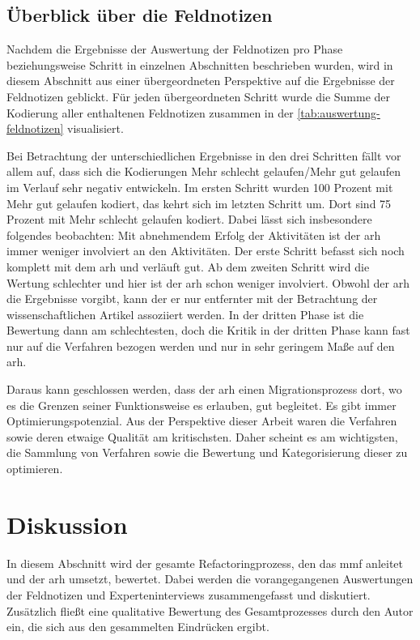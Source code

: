 \subsection{Überblick über die Feldnotizen}

Nachdem die Ergebnisse der Auswertung der Feldnotizen pro Phase beziehungsweise Schritt in einzelnen Abschnitten beschrieben wurden, wird in diesem Abschnitt aus einer übergeordneten Perspektive auf die Ergebnisse der Feldnotizen geblickt.
Für jeden übergeordneten Schritt wurde die Summe der Kodierung aller enthaltenen Feldnotizen zusammen in der \cref{tab:auswertung-feldnotizen} visualisiert.


Bei Betrachtung der unterschiedlichen Ergebnisse in den drei Schritten fällt vor allem auf, dass sich die Kodierungen \glqq Mehr schlecht gelaufen\grqq{}/\glqq Mehr gut gelaufen\grqq{} im Verlauf sehr negativ entwickeln.
Im ersten Schritt wurden 100 Prozent mit \glqq Mehr gut gelaufen\grqq{} kodiert, das kehrt sich im letzten Schritt um.
Dort sind 75 Prozent mit \glqq Mehr schlecht gelaufen\grqq{} kodiert.
Dabei lässt sich insbesondere folgendes beobachten: Mit abnehmendem Erfolg der Aktivitäten ist der \gls{arh} immer weniger involviert an den Aktivitäten.
Der erste Schritt befasst sich noch komplett mit dem \gls{arh} und verläuft gut.
Ab dem zweiten Schritt wird die Wertung schlechter und hier ist der \gls{arh} schon weniger involviert.
Obwohl der \gls{arh} die Ergebnisse vorgibt, kann der er nur entfernter mit der Betrachtung der wissenschaftlichen Artikel assoziiert werden.
In der dritten Phase ist die Bewertung dann am schlechtesten, doch die Kritik in der dritten Phase kann fast nur auf die Verfahren bezogen werden und nur in sehr geringem Maße auf den \gls{arh}.

Daraus kann geschlossen werden, dass der \gls{arh} einen Migrationsprozess dort, wo es die Grenzen seiner Funktionsweise es erlauben, gut begleitet.
Es gibt immer Optimierungspotenzial.
Aus der Perspektive dieser Arbeit waren die Verfahren sowie deren etwaige Qualität am kritischsten.
Daher scheint es am wichtigsten, die Sammlung von Verfahren sowie die Bewertung und Kategorisierung dieser zu optimieren.

\section{Diskussion}
\label{sec:auswertung-diskussion}

In diesem Abschnitt wird der gesamte Refactoringprozess, den das \gls{mmf} anleitet und der \gls{arh} umsetzt, bewertet.
Dabei werden die vorangegangenen Auswertungen der Feldnotizen und Experteninterviews zusammengefasst und diskutiert.
Zusätzlich fließt eine qualitative Bewertung des Gesamtprozesses durch den Autor ein, die sich aus den gesammelten Eindrücken ergibt.

